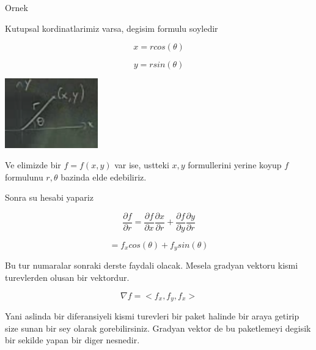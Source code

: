\documentclass[12pt,fleqn]{article}\usepackage{../common}
\begin{document}
Ornek

Kutupsal kordinatlarimiz varsa, degisim formulu soyledir

\[ x = r cos(\theta) \]

\[ y = r sin(\theta) \]

\includegraphics[height=3cm]{11_1.png}

Ve elimizde bir $f=f(x,y)$ var ise, ustteki $x,y$ formullerini yerine
koyup $f$ formulunu $r,\theta$ bazinda elde edebiliriz.

Sonra su hesabi yapariz

\[ \frac{\partial f}{\partial r} = 
\frac{\partial f}{\partial x}
\frac{\partial x}{\partial r} +
\frac{\partial f}{\partial y}
\frac{\partial y}{\partial r}
 \]

\[ = f_xcos(\theta) + f_y sin(\theta) \]

Bu tur numaralar sonraki derste faydali olacak. Mesela gradyan vektoru
kismi turevlerden olusan bir vektordur. 

\[ \nabla f = <f_x,f_y,f_x> \]

Yani aslinda bir diferansiyeli kismi turevleri bir paket halinde bir araya
getirip size sunan bir sey olarak gorebilirsiniz. Gradyan vektor de bu
paketlemeyi degisik bir sekilde yapan bir diger nesnedir. 
\end{document}
